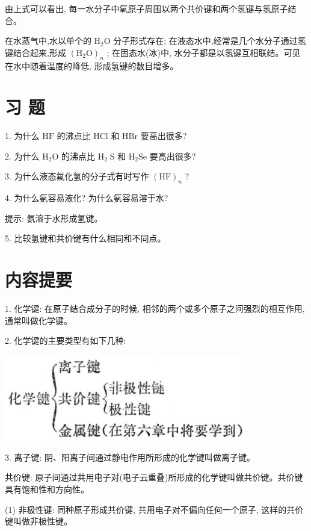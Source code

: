 \documentclass[10pt]{article}
\begin{document}
由上式可以看出, 每一水分子中氧原子周围以两个共价键和两个氢键与氢原子结合。

在水蒸气中,水以单个的 \({\mathrm{H}}_{2}\mathrm{O}\) 分子形式存在; 在液态水中,经常是几个水分子通过氢键结合起来,形成 \({\left( {\mathrm{H}}_{2}\mathrm{O}\right) }_{n}\) ; 在固态水(冰)中, 水分子都是以氢键互相联结。可见在水中随着温度的降低, 形成氢键的数目增多。

\section*{习 题}

1. 为什么 \(\mathrm{{HF}}\) 的沸点比 \(\mathrm{{HCl}}\) 和 \(\mathrm{{HBr}}\) 要高出很多?

2. 为什么 \({\mathrm{H}}_{2}\mathrm{O}\) 的沸点比 \({\mathrm{H}}_{2}\mathrm{\;S}\) 和 \({\mathrm{H}}_{2}\mathrm{{Se}}\) 要高出很多?

3. 为什么液态氟化氢的分子式有时写作 \({\left( \mathrm{{HF}}\right) }_{n}\) ?

4. 为什么氨容易液化? 为什么氨容易溶于水?

提示: 氨溶于水形成氢键。

5. 比较氢键和共价键有什么相同和不同点。

\section*{内容提要}

1. 化学键: 在原子结合成分子的时候, 相邻的两个或多个原子之间强烈的相互作用, 通常叫做化学键。

2. 化学键的主要类型有如下几种:

\begin{center}
\includegraphics[max width=0.8\textwidth]{images/01912d13-9986-7822-a012-3f3f7be99dcb_31_802703.jpg}
\end{center}

3. 离子键: 阴、阳离子间通过静电作用所形成的化学键叫做离子键。

共价键: 原子间通过共用电子对(电子云重叠)所形成的化学键叫做共价键。共价键具有饱和性和方向性。

(1) 非极性键: 同种原子形成共价键, 共用电子对不偏向任何一个原子, 这样的共价键叫做非极性键。
\end{document}
